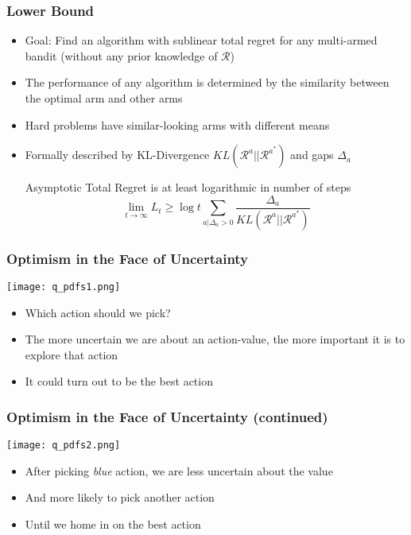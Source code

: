 \documentclass[handout]{beamer}
\begin{document}
\begin{frame}
\frametitle{Lower Bound}
\pause
\begin{itemize}[<+->]
\item Goal: Find an algorithm with sublinear total regret for any multi-armed bandit (without any prior knowledge of $\mathcal{R}$)
\item The performance of any algorithm is determined by the similarity between the optimal arm and other arms
\item Hard problems have similar-looking arms with different means
\item Formally described by KL-Divergence $KL(\mathcal{R}^a||\mathcal{R}^{a^*})$ and gaps $\Delta_a$
\begin{theorem}
Asymptotic Total Regret is at least logarithmic in number of steps
$$\lim_{t\rightarrow \infty} L_t \geq \log t \sum_{a|\Delta_a > 0} \frac {\Delta_a} {KL(\mathcal{R}^a||\mathcal{R}^{a^*})}$$
\end{theorem}
\end{itemize}
\end{frame}

\begin{frame}
\frametitle{Optimism in the Face of Uncertainty}
\pause
\texttt{[image: q\_pdfs1.png]}
\begin{itemize}[<+->]
\item Which action should we pick?
\item The more uncertain we are about an action-value, the more important it is to explore that action
\item It could turn out to be the best action
\end{itemize}
\end{frame}

\begin{frame}
\frametitle{Optimism in the Face of Uncertainty (continued)}
\pause
\texttt{[image: q\_pdfs2.png]}
\begin{itemize}[<+->]
\item After picking {\em blue} action, we are less uncertain about the value
\item And more likely to pick another action
 \item Until we home in on the best action
\end{itemize}
\end{frame}
\end{document}
